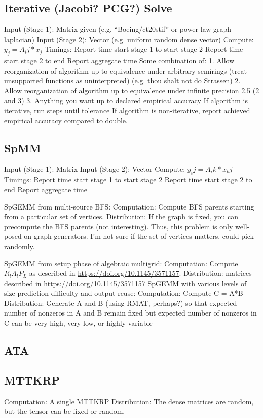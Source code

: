 \documentclass{article}
\begin{document}
\subsection{Iterative (Jacobi? PCG?) Solve}
	Input (Stage 1):
		Matrix given (e.g. “Boeing/ct20stif” or power-law graph laplacian)
	Input (Stage 2):
		Vector (e.g. uniform random dense vector)
	Compute:
		$y_j = A_ij * x_j$
	Timings:
Report time start stage 1 to start stage 2
Report time start stage 2 to end
Report aggregate time
Some combination of:
1. Allow reorganization of algorithm up to equivalence under arbitrary semirings (treat unsupported functions as uninterpreted) (e.g. thou shalt not do Strassen)
2. Allow reorganization of algorithm up to equivalence under infinite precision
2.5 (2 and 3)
3. Anything you want up to declared empirical accuracy
If algorithm is iterative, run steps until tolerance
If algorithm is non-iterative, report achieved empirical accuracy compared to double.

\subsection{SpMM}
	Input (Stage 1):
		Matrix
	Input (Stage 2):
		Vector
	Compute:
		$y_ij = A_ik * x_kj$
	Timings:
Report time start stage 1 to start stage 2
Report time start stage 2 to end
Report aggregate time

SpGEMM from multi-source BFS:
	Computation: Compute BFS parents starting from a particular set of vertices.
	Distribution: If the graph is fixed, you can precompute the BFS parents (not interesting). Thus, this problem is only well-posed on graph generators. I’m not sure if the set of vertices matters, could pick randomly.

SpGEMM from setup phase of algebraic multigrid:
	Computation: Compute $R_lA_lP_L$ as described in \url{https://doi.org/10.1145/3571157}.
	Distribution: matrices described in \url{https://doi.org/10.1145/3571157}
SpGEMM with various levels of size prediction difficulty and output reuse:
	Computation: Compute C = A*B
	Distribution: Generate A and B (using RMAT, perhaps?) so that expected number of nonzeros in A and B remain fixed but expected number of nonzeros in C can be very high, very low, or highly variable

\subsection{ATA}

\subsection{MTTKRP}
	Computation: A single MTTKRP 
	Distribution: The dense matrices are random, but the tensor can be fixed or random.
\end{document}
